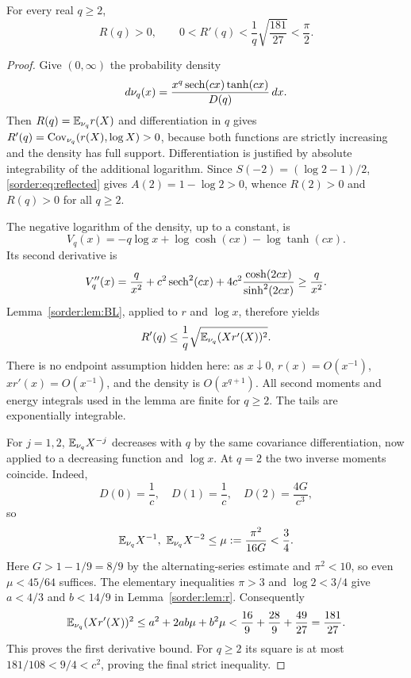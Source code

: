 \begin{theorem}\label{sorder:thm:R}
For every real $q\ge2$,
\begin{equation}\label{sorder:eq:R-bound}
 R(q)>0,\qquad
 0<R'(q)<\frac1q\sqrt{\frac{181}{27}}<\frac\pi2.
\end{equation}
\end{theorem}
\begin{proof}
Give $(0,\infty)$ the probability density
\[
 d\nu_q(x)=\frac{x^q\operatorname{sech}(cx)\tanh(cx)}{D(q)}\,dx.
\]
Then $R(q)=\mathbb E_{\nu_q}r(X)$ and differentiation in $q$ gives
$R'(q)=\operatorname{Cov}_{\nu_q}(r(X),\log X)>0$, because both functions are
strictly increasing and the density has full support. Differentiation
is justified by absolute integrability of the additional logarithm.
Since $S(-2)=(\log2-1)/2$, \eqref{sorder:eq:reflected} gives
$A(2)=1-\log2>0$, whence $R(2)>0$ and $R(q)>0$ for all $q\ge2$.

The negative logarithm of the density, up to a constant, is
\[
 V_q(x)=-q\log x+\log\cosh(cx)-\log\tanh(cx).
\]
Its second derivative is
\[
 V_q''(x)=\frac q{x^2}+c^2\operatorname{sech}^2(cx)
     +4c^2\frac{\cosh(2cx)}{\sinh^2(2cx)}\ge\frac q{x^2}.
\]
Lemma~\ref{sorder:lem:BL}, applied to $r$ and $\log x$, therefore yields
\begin{equation}\label{sorder:eq:covariance-bound}
 R'(q)\le\frac1q\sqrt{\mathbb E_{\nu_q}(Xr'(X))^2}.
\end{equation}
There is no endpoint assumption hidden here: as $x\downarrow0$,
$r(x)=O(x^{-1})$, $xr'(x)=O(x^{-1})$, and the density is
$O(x^{q+1})$. All second moments and energy integrals used in the
lemma are finite for $q\ge2$. The tails are exponentially integrable.

For $j=1,2$, $\mathbb E_{\nu_q}X^{-j}$ decreases with $q$ by the same
covariance differentiation, now applied to a decreasing function and
$\log x$. At $q=2$ the two inverse moments coincide. Indeed,
\[
 D(0)=\frac1c,\quad D(1)=\frac1c,\quad D(2)=\frac{4G}{c^3},
\]
so
\[
 \mathbb E_{\nu_q}X^{-1},\ \mathbb E_{\nu_q}X^{-2}
 \le\mu:=\frac{\pi^2}{16G}<\frac34.
\]
Here $G>1-1/9=8/9$ by the alternating-series estimate and
$\pi^2<10$, so even $\mu<45/64$ suffices. The elementary inequalities
$\pi>3$ and $\log2<3/4$ give $a<4/3$ and $b<14/9$ in
Lemma~\ref{sorder:lem:r}. Consequently
\[
 \mathbb E_{\nu_q}(Xr'(X))^2
 \le a^2+2ab\mu+b^2\mu
 <\frac{16}{9}+\frac{28}{9}+\frac{49}{27}
 =\frac{181}{27}.
\]
This proves the first derivative bound. For $q\ge2$ its square is
at most $181/108<9/4<c^2$, proving the final strict inequality.
\end{proof}

